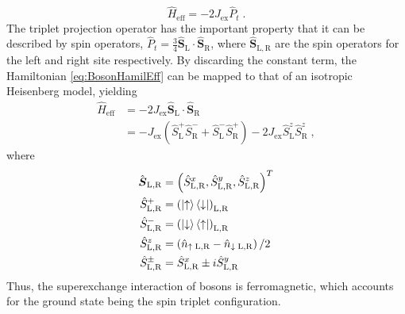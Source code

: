 \begin{equation}
	\hat{H}_{\mathrm{eff}} = -2 J_{\mathrm{ex}} \hat{P}_t \; . 
\end{equation}  
The triplet projection operator has the important property that it can be described by spin operators, $\hat{P}_t = \frac{3}{4} \hat{\boldsymbol{S}}_{\mathrm{L}} \cdot \hat{\boldsymbol{S}}_{\mathrm{R}}$, where $\hat{\boldsymbol{S}}_{\mathrm{L,R}}$ are the spin operators for the left and right site respectively. By discarding the constant term, the Hamiltonian \eqref{eq:BosonHamilEff} can be mapped to that of an isotropic Heisenberg model, yielding \cite{Trotzky2008}
\begin{align}
	\hat{H}_{\mathrm{eff}} &= -2 J_{\mathrm{ex}} \hat{\boldsymbol{S}}_{\mathrm{L}} \cdot \hat{\boldsymbol{S}}_{\mathrm{R}} \nonumber \\
	&= - J_{\mathrm{ex}} \left( \hat{S}_{\mathrm{L}}^{+} \hat{S}_{\mathrm{R}}^{-} + \hat{S}_{\mathrm{L}}^{-} \hat{S}_{\mathrm{R}}^{+} \right) - 2 J_{\mathrm{ex}} \hat{S}_{\mathrm{L}}^{z} \hat{S}_{\mathrm{R}}^{z} \; , \label{eq:twositeFerro}
\end{align}
where 
\begin{align*}
\hat{\boldsymbol{S}}_{\mathrm{L,R}} &= \left(  \hat{S}_{\mathrm{L,R}}^{x} , \hat{S}_{\mathrm{L,R}}^{y} , \hat{S}_{\mathrm{L,R}}^{z} \right)^{T} \\
\hat{S}_{\mathrm{L},\mathrm{R}}^{+} &= \left( \ket{\uparrow}\bra{\downarrow} \right)_{\mathrm{L},\mathrm{R}} \\
\hat{S}_{\mathrm{L},\mathrm{R}}^{-} &= \left( \ket{\downarrow}\bra{\uparrow} \right)_{\mathrm{L},\mathrm{R}} \\
\hat{S}_{\mathrm{L},\mathrm{R}}^{z} &= \left( \hat{n}_{\uparrow \; \mathrm{L},\mathrm{R}} - \hat{n}_{\downarrow \; \mathrm{L},\mathrm{R}} \right)/2 \\
\hat{S}_{\mathrm{L},\mathrm{R}}^{\pm} &= \hat{S}_{\mathrm{L},\mathrm{R}}^{x} \pm i \hat{S}_{\mathrm{L},\mathrm{R}}^{y}
\end{align*}
Thus, the superexchange interaction of bosons is ferromagnetic, which accounts for the ground state being the spin triplet configuration.

